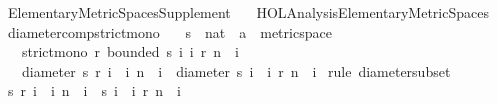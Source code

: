%
\begin{isabellebody}%
%
%
\isadelimtheory
%
\endisadelimtheory
%
\isatagtheory
{}\isamarkupfalse%
\ Elementary{\isacharunderscore}{\kern0pt}Metric{\isacharunderscore}{\kern0pt}Spaces{\isacharunderscore}{\kern0pt}Supplement\isanewline
\ \ \ {\isachardoublequoteopen}HOL{\isacharminus}{\kern0pt}Analysis{\isachardot}{\kern0pt}Elementary{\isacharunderscore}{\kern0pt}Metric{\isacharunderscore}{\kern0pt}Spaces{\isachardoublequoteclose}\isanewline
{}%
\endisatagtheory
{\isafoldtheory}%
%
\isadelimtheory
%
\endisadelimtheory
%
\isadelimdocument
%
\endisadelimdocument
%
\isatagdocument
%
\isamarkuptrue%
%
\isamarkuptrue%
%
\endisatagdocument
{\isafolddocument}%
%
\isadelimdocument
%
\endisadelimdocument
{}\isamarkupfalse%
\ diameter{\isacharunderscore}{\kern0pt}comp{\isacharunderscore}{\kern0pt}strict{\isacharunderscore}{\kern0pt}mono{\isacharcolon}{\kern0pt}\isanewline
\ \ \ s\ {\isacharcolon}{\kern0pt}{\isacharcolon}{\kern0pt}\ {\isachardoublequoteopen}nat\ {\isasymRightarrow}\ {\isacharprime}{\kern0pt}a\ {\isacharcolon}{\kern0pt}{\isacharcolon}{\kern0pt}\ metric{\isacharunderscore}{\kern0pt}space{\isachardoublequoteclose}\isanewline
\ \ \ {\isachardoublequoteopen}strict{\isacharunderscore}{\kern0pt}mono\ r{\isachardoublequoteclose}\ {\isachardoublequoteopen}bounded\ {\isacharbraceleft}{\kern0pt}s\ i\ {\isacharbar}{\kern0pt}i{\isachardot}{\kern0pt}\ r\ n\ {\isasymle}\ i{\isacharbraceright}{\kern0pt}{\isachardoublequoteclose}\isanewline
\ \ \ {\isachardoublequoteopen}diameter\ {\isacharbraceleft}{\kern0pt}s\ {\isacharparenleft}{\kern0pt}r\ i{\isacharparenright}{\kern0pt}\ {\isacharbar}{\kern0pt}\ i{\isachardot}{\kern0pt}\ n\ {\isasymle}\ i{\isacharbraceright}{\kern0pt}\ {\isasymle}\ diameter\ {\isacharbraceleft}{\kern0pt}s\ i\ {\isacharbar}{\kern0pt}\ i{\isachardot}{\kern0pt}\ r\ n\ {\isasymle}\ i{\isacharbraceright}{\kern0pt}{\isachardoublequoteclose}\isanewline
%
\isadelimproof
%
\endisadelimproof
%
\isatagproof
{}\isamarkupfalse%
\ {\isacharparenleft}{\kern0pt}rule\ diameter{\isacharunderscore}{\kern0pt}subset{\isacharparenright}{\kern0pt}\isanewline
\ \ \isamarkupfalse%
\ {\isachardoublequoteopen}{\isacharbraceleft}{\kern0pt}s\ {\isacharparenleft}{\kern0pt}r\ i{\isacharparenright}{\kern0pt}\ {\isacharbar}{\kern0pt}\ i{\isachardot}{\kern0pt}\ n\ {\isasymle}\ i{\isacharbraceright}{\kern0pt}\ {\isasymsubseteq}\ {\isacharbraceleft}{\kern0pt}s\ i\ {\isacharbar}{\kern0pt}\ i{\isachardot}{\kern0pt}\ r\ n\ {\isasymle}\ i{\isacharbraceright}{\kern0pt}{\isachardoublequoteclose}\ \isamarkupfalse%

\end{isabellebody}

